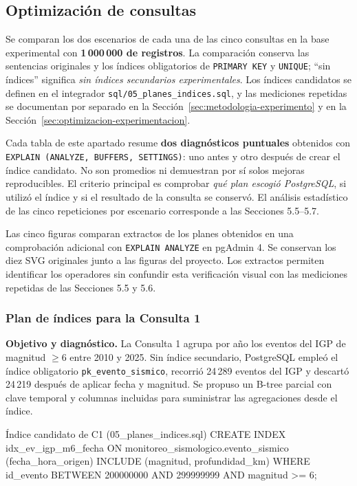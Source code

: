 \documentclass[12pt,a4paper]{article}
\begin{document}
\subsection{Optimización de consultas}
\label{sec:optimizacion-indices}

Se comparan los dos escenarios de cada una de las cinco consultas
en la base experimental con \textbf{1\,000\,000 de registros}. La comparación conserva las
sentencias originales y los índices obligatorios de \texttt{PRIMARY KEY}
y \texttt{UNIQUE}; ``sin índices'' significa \emph{sin índices secundarios
experimentales}. Los índices candidatos se definen en el integrador
\texttt{sql/05\_planes\_indices.sql}, y las mediciones repetidas se
documentan por separado en la Sección~\ref{sec:metodologia-experimento}
y en la Sección~\ref{sec:optimizacion-experimentacion}.

Cada tabla de este apartado resume \textbf{dos diagnósticos puntuales}
obtenidos con \texttt{EXPLAIN (ANALYZE, BUFFERS, SETTINGS)}:
uno antes y otro después de crear el índice candidato. No son
promedios ni demuestran por sí solos mejoras reproducibles. El
criterio principal es comprobar \emph{qué plan escogió PostgreSQL},
si utilizó el índice y si el resultado de la consulta se conservó.
El análisis estadístico de las cinco repeticiones por escenario
corresponde a las Secciones 5.5--5.7.

Las cinco figuras comparan extractos de los planes obtenidos en una
comprobación adicional con \texttt{EXPLAIN ANALYZE} en pgAdmin 4.
Se conservan los diez SVG originales junto a las figuras del proyecto.
Los extractos permiten identificar los operadores sin confundir esta
verificación visual con las mediciones repetidas de las Secciones 5.5 y 5.6.

\subsubsection{Plan de índices para la Consulta 1}
\label{sec:plan-indice-consulta-1}

\textbf{Objetivo y diagnóstico.} La Consulta 1 agrupa por año los
eventos del IGP de magnitud \(\geq 6\) entre 2010 y 2025. Sin
índice secundario, PostgreSQL empleó el índice obligatorio
\texttt{pk\_evento\_sismico}, recorrió 24\,289 eventos del IGP
y descartó 24\,219 después de aplicar fecha y magnitud. Se propuso
un B-tree parcial con clave temporal y columnas incluidas para
suministrar las agregaciones desde el índice.

\begin{sqlbloque}{Índice candidato de C1 (05\_planes\_indices.sql)}
CREATE INDEX idx_ev_igp_m6_fecha
ON monitoreo_sismologico.evento_sismico (fecha_hora_origen)
INCLUDE (magnitud, profundidad_km)
WHERE id_evento BETWEEN 200000000 AND 299999999
  AND magnitud >= 6;
\end{sqlbloque}
\end{document}
